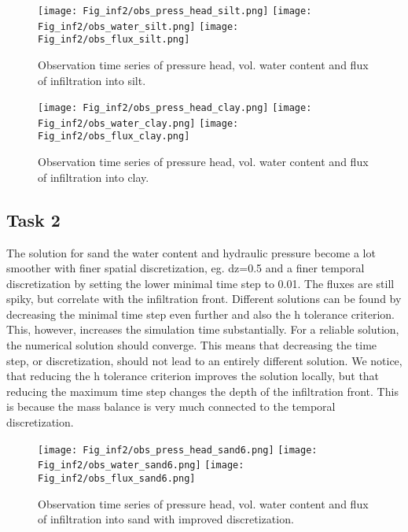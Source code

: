 \begin{figure}[!h]
\centering
\texttt{[image: Fig\_inf2/obs\_press\_head\_silt.png]}
\texttt{[image: Fig\_inf2/obs\_water\_silt.png]}
\texttt{[image: Fig\_inf2/obs\_flux\_silt.png]}
\caption{Observation time series of pressure head, vol. water content and flux of infiltration into silt.}

\end{figure}


\begin{figure}[!h]
\centering
\texttt{[image: Fig\_inf2/obs\_press\_head\_clay.png]}
\texttt{[image: Fig\_inf2/obs\_water\_clay.png]}
\texttt{[image: Fig\_inf2/obs\_flux\_clay.png]}
\caption{Observation time series of pressure head, vol. water content and flux of infiltration into clay.}

\end{figure}

\newpage
\newpage
\subsection*{Task 2}

The solution for sand the water content and hydraulic pressure become a lot smoother with finer spatial discretization, eg. dz=0.5 and a finer temporal discretization by setting the lower minimal time step to 0.01. The fluxes are still spiky, but correlate with the infiltration front. Different solutions can be found by decreasing the minimal time step even further and also the h tolerance criterion. This, however, increases the simulation time substantially. For a reliable solution, the numerical solution should converge. This means that decreasing the time step, or discretization, should not lead to an entirely different solution. We notice, that reducing the h tolerance criterion improves the solution locally, but that reducing the maximum time step changes the depth of the infiltration front. This is because the mass balance is very much connected to the temporal discretization.

\begin{figure}[!h]
	\centering
	\texttt{[image: Fig\_inf2/obs\_press\_head\_sand6.png]}
	\texttt{[image: Fig\_inf2/obs\_water\_sand6.png]}
	\texttt{[image: Fig\_inf2/obs\_flux\_sand6.png]}
	\caption{Observation time series of pressure head, vol. water content and flux of infiltration into sand with improved discretization.}
\end{figure}

